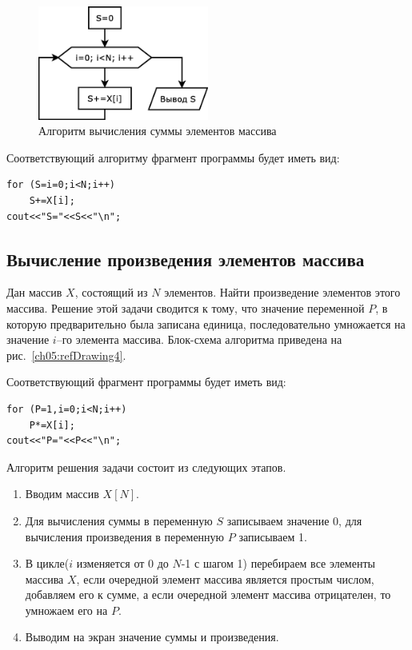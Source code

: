 \begin{figure}[htb]
\begin{center}
\includegraphics[width=0.5\textwidth]{img/ris_5_4}
\caption{Алгоритм вычисления суммы элементов массива}
\label{ch05:refDrawing3}
\end{center}
\end{figure}

Соответствующий алгоритму фрагмент программы будет иметь вид:
\begin{lstlisting}
for (S=i=0;i<N;i++)
    S+=X[i];
cout<<"S="<<S<<"\n";
\end{lstlisting}

\subsection[Вычисление произведения элементов массива]{Вычисление произведения элементов массива}
Дан массив $X$, состоящий из $N$ элементов. Найти произведение элементов этого массива. Решение этой задачи сводится к тому, что значение переменной
$P$, в которую предварительно была записана единица, последовательно умножается на значение
$i$–го элемента массива. Блок-схема алгоритма приведена на рис.~\ref{ch05:refDrawing4}.

Соответствующий фрагмент программы будет иметь вид:
\begin{lstlisting}
for (P=1,i=0;i<N;i++)
    P*=X[i];
cout<<"P="<<P<<"\n";
\end{lstlisting}


Алгоритм решения задачи состоит из следующих этапов.

\begin{enumerate}
\item Вводим массив $X[N]$.
\item Для вычисления суммы в переменную $S$ записываем значение 0, для вычисления произведения в
переменную $P$ записываем 1.
\item В цикле($i$ изменяется от 0 до $N$-1 с шагом 1) перебираем все элементы
массива $X$, если очередной элемент массива является простым числом, добавляем его к сумме, а если
очередной элемент массива отрицателен, то умножаем его на $P$.
\item Выводим на экран значение суммы и произведения.
\end{enumerate}

